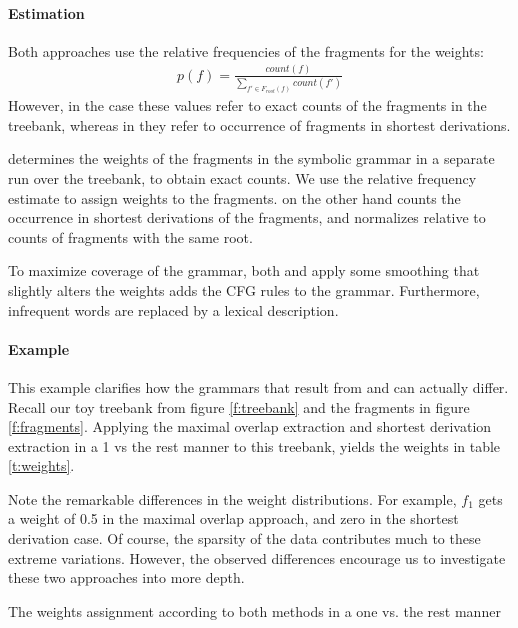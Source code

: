 \paragraph{Estimation}

Both approaches use the relative frequencies of the fragments for the weights:
\begin{align}p(f)=\frac{count(f)}{\sum_{f'\in F_{root}(f)} count(f')}\end{align} 
However, in the \ddop{} case these values refer to exact counts of the fragments in the treebank, whereas in \dops{} they refer to occurrence of fragments in shortest derivations.


\ddop{} determines the weights of the fragments in the symbolic grammar in a separate run over the treebank, to obtain exact counts. We use the relative frequency estimate to assign weights to the fragments. \dops{} on the other hand counts the occurrence in shortest derivations of the fragments, and normalizes relative to counts of fragments with the same root.

To maximize coverage of the grammar, both \ddop{} and \dops{} apply some smoothing that slightly alters the weights
 \ddop{} adds the CFG rules to the grammar. Furthermore, infrequent words are replaced by a lexical description.




\paragraph{Example}
\FloatBarrier
This example clarifies how the grammars that result from \ddop{} and \dops{} can actually differ. Recall our toy treebank from figure \ref{f:treebank} and the fragments in figure \ref{f:fragments}. 
Applying the maximal overlap extraction and shortest derivation extraction in a 1 vs the rest manner to this treebank, yields the weights in table \ref{t:weights}.

Note the remarkable differences in the weight distributions. For example, $f_1$ gets a weight of 0.5 in the maximal overlap approach, and zero in the shortest derivation case. Of course, the sparsity of the data contributes much to these extreme variations. However, the observed differences encourage us to investigate these two approaches into more depth.



\begin{table}[h!]
\center

\caption{The weights assignment according to both methods in a one vs. the rest manner}
\label{t:weights}
\end{table}





